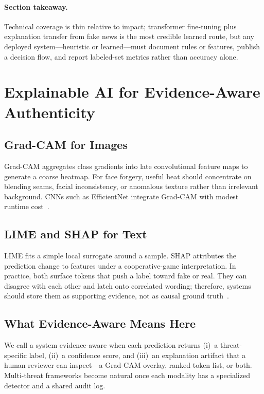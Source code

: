 \documentclass[runningheads]{llncs}
\begin{document}
\paragraph{Section takeaway.}
Technical coverage is thin relative to impact; transformer fine-tuning plus explanation transfer from fake news is the most credible learned route, but any deployed system---heuristic or learned---must document rules or features, publish a decision flow, and report labeled-set metrics rather than accuracy alone.

\section{Explainable AI for Evidence-Aware Authenticity}
\label{sec:xai}

\subsection{Grad-CAM for Images}
Grad-CAM aggregates class gradients into late convolutional feature maps to generate a coarse heatmap. For face forgery, useful heat should concentrate on blending seams, facial inconsistency, or anomalous texture rather than irrelevant background. CNNs such as EfficientNet integrate Grad-CAM with modest runtime cost~\cite{r02,r07,r13,r39}.

\subsection{LIME and SHAP for Text}
LIME fits a simple local surrogate around a sample. SHAP attributes the prediction change to features under a cooperative-game interpretation. In practice, both surface tokens that push a label toward fake or real. They can disagree with each other and latch onto correlated wording; therefore, systems should store them as supporting evidence, not as causal ground truth~\cite{r26,r40,r29}.

\subsection{What Evidence-Aware Means Here}
We call a system evidence-aware when each prediction returns (i)~a threat-specific label, (ii)~a confidence score, and (iii)~an explanation artifact that a human reviewer can inspect---a Grad-CAM overlay, ranked token list, or both. Multi-threat frameworks become natural once each modality has a specialized detector and a shared audit log.
\end{document}
